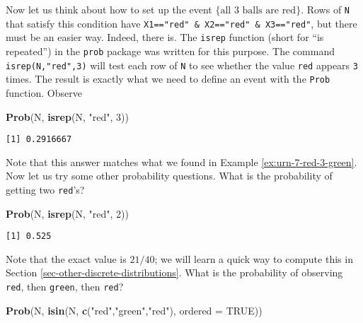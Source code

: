 \documentclass[]{book}
\newenvironment{Shaded}{\begin{snugshade}}{\end{snugshade}}
\newcommand{\KeywordTok}[1]{\textcolor[rgb]{0.13,0.29,0.53}{\textbf{{#1}}}}
\newcommand{\DataTypeTok}[1]{\textcolor[rgb]{0.13,0.29,0.53}{{#1}}}
\newcommand{\DecValTok}[1]{\textcolor[rgb]{0.00,0.00,0.81}{{#1}}}
\newcommand{\StringTok}[1]{\textcolor[rgb]{0.31,0.60,0.02}{{#1}}}
\newcommand{\OtherTok}[1]{\textcolor[rgb]{0.56,0.35,0.01}{{#1}}}
\newcommand{\NormalTok}[1]{{#1}}
\numberwithin{equation}{chapter}
\numberwithin{figure}{chapter}
\theoremstyle{plain}
\theoremstyle{definition}
\theoremstyle{remark}
\theoremstyle{definition}
\theoremstyle{definition}
\theoremstyle{remark}
\begin{document}
Now let us think about how to set up the event
\(\{ \mbox{all 3 balls are red}\}\). Rows of \texttt{N} that satisfy
this condition have \texttt{X1=="red"\ \&\ X2=="red"\ \&\ X3=="red"},
but there must be an easier way. Indeed, there is. The \texttt{isrep}
function (short for ``is repeated'') in the \texttt{prob} package was
written for this purpose. The command \texttt{isrep(N,"red",3)} will
test each row of \texttt{N} to see whether the value \texttt{red}
appears \texttt{3} times. The result is exactly what we need to define
an event with the \texttt{Prob} function. Observe

\begin{Shaded}
\begin{Highlighting}[]
\KeywordTok{Prob}\NormalTok{(N, }\KeywordTok{isrep}\NormalTok{(N, }\StringTok{"red"}\NormalTok{, }\DecValTok{3}\NormalTok{))}
\end{Highlighting}
\end{Shaded}

\begin{verbatim}
[1] 0.2916667
\end{verbatim}

Note that this answer matches what we found in Example
\ref{ex:urn-7-red-3-green}. Now let us try some other probability
questions. What is the probability of getting two \texttt{red}'s?

\begin{Shaded}
\begin{Highlighting}[]
\KeywordTok{Prob}\NormalTok{(N, }\KeywordTok{isrep}\NormalTok{(N, }\StringTok{"red"}\NormalTok{, }\DecValTok{2}\NormalTok{))}
\end{Highlighting}
\end{Shaded}

\begin{verbatim}
[1] 0.525
\end{verbatim}

Note that the exact value is \(21/40\); we will learn a quick way to
compute this in Section \ref{sec-other-discrete-distributions}. What is
the probability of observing \texttt{red}, then \texttt{green}, then
\texttt{red}?

\begin{Shaded}
\begin{Highlighting}[]
\KeywordTok{Prob}\NormalTok{(N, }\KeywordTok{isin}\NormalTok{(N, }\KeywordTok{c}\NormalTok{(}\StringTok{"red"}\NormalTok{,}\StringTok{"green"}\NormalTok{,}\StringTok{"red"}\NormalTok{), }\DataTypeTok{ordered =} \OtherTok{TRUE}\NormalTok{))}
\end{Highlighting}
\end{Shaded}
\end{document}
